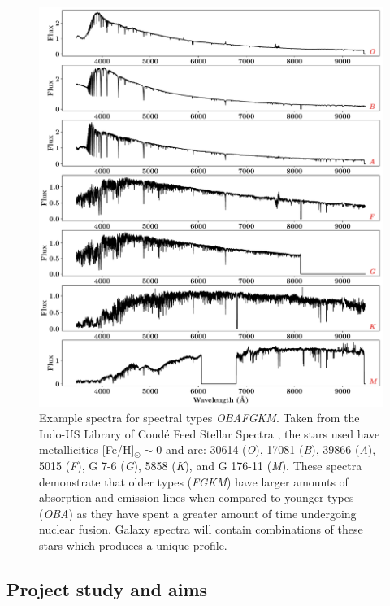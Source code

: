 \documentclass[12pt, twocolumn]{revtex4-1}    %
\begin{document}
\begin{figure}
\includegraphics[width=1.0\linewidth]{introduction/spectral_types}
\caption{Example spectra for spectral types \textit{OBAFGKM}. Taken from the Indo-US Library of Coudé Feed Stellar Spectra \citep{valdes_coude}, the stars used have metallicities [Fe/H]$_{\odot} \sim$0  and are: 30614 (\textit{O}), 17081 (\textit{B}), 39866 (\textit{A}), 5015 (\textit{F}), G 7-6 (\textit{G}), 5858 (\textit{K}), and G 176-11 (\textit{M}). These spectra demonstrate that older types (\textit{FGKM}) have larger amounts of absorption and emission lines when compared to younger types (\textit{OBA}) as they have spent a greater amount of time undergoing nuclear fusion. Galaxy spectra will contain combinations of these stars which produces a unique profile.}
\label{fig:spectral_types}
\end{figure}

\subsection{Project study and aims} %

\end{document}
